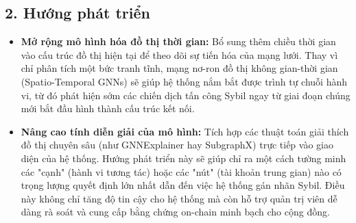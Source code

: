 \subsection{2. Hướng phát triển}

\begin{itemize}[label={--}, itemsep=1pt]
    \item \textbf{Mở rộng mô hình hóa đồ thị thời gian:} Bổ sung thêm chiều thời gian vào cấu trúc đồ thị hiện tại để theo dõi sự tiến hóa của mạng lưới. Thay vì chỉ phân tích một bức tranh tĩnh, mạng nơ-ron đồ thị không gian-thời gian (Spatio-Temporal GNNs) sẽ giúp hệ thống nắm bắt được trình tự chuỗi hành vi, từ đó phát hiện sớm các chiến dịch tấn công Sybil ngay từ giai đoạn chúng mới bắt đầu hình thành cấu trúc kết nối.
    
    \item \textbf{Nâng cao tính diễn giải của mô hình:} Tích hợp các thuật toán giải thích đồ thị chuyên sâu (như GNNExplainer hay SubgraphX) trực tiếp vào giao diện của hệ thống. Hướng phát triển này sẽ giúp chỉ ra một cách tường minh các "cạnh" (hành vi tương tác) hoặc các "nút" (tài khoản trung gian) nào có trọng lượng quyết định lớn nhất dẫn đến việc hệ thống gán nhãn Sybil. Điều này không chỉ tăng độ tin cậy cho hệ thống mà còn hỗ trợ quản trị viên dễ dàng rà soát và cung cấp bằng chứng on-chain minh bạch cho cộng đồng.
\end{itemize}